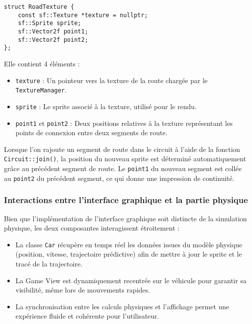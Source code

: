 \begin{itemize}
\begin{lstlisting}[style=CStyle,label={lst:struct_roadtexture}]
struct RoadTexture {
    const sf::Texture *texture = nullptr;
    sf::Sprite sprite;
    sf::Vector2f point1;
    sf::Vector2f point2;
};
\end{lstlisting}

Elle contient 4 éléments :
\begin{itemize}
    \item \texttt{texture} : Un pointeur vers la texture de la route chargée par le \texttt{TextureManager}.
    \item \texttt{sprite} : Le sprite associé à la texture, utilisé pour le rendu. %
    \item \texttt{point1} et \texttt{point2} : Deux positions relatives à la texture représentant les points de connexion entre deux segments de route.
\end{itemize}

Lorsque l'on rajoute un segment de route dans le circuit à l'aide de la fonction \texttt{Circuit::join()}, la position du nouveau sprite est déterminé automatiquement grâce au précédent segment de route.
Le \texttt{point1} du nouveau segment est collée au \texttt{point2} du précédent segment, ce qui donne une impression de continuité.

\subsubsection{Interactions entre l'interface graphique et la partie physique}\label{subsubsec:interactions-entre-l-interface-graphique-et-la-partie-physique}
Bien que l'implémentation de l'interface graphique soit distincte de la simulation physique, les deux composantes interagissent étroitement :
\begin{itemize}
    \item La classe \texttt{Car} récupère en temps réel les données issues du modèle physique (position, vitesse, trajectoire prédictive) afin de mettre à jour le sprite et le tracé de la trajectoire.
    \item La Game View est dynamiquement recentrée sur le véhicule pour garantir sa visibilité, même lors de mouvements rapides.
    \item La synchronisation entre les calculs physiques et l'affichage permet une expérience fluide et cohérente pour l'utilisateur.
\end{itemize}


\end{itemize}
